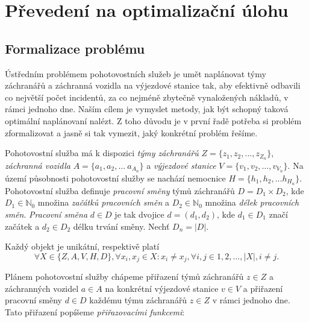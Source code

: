 \chapter{Převedení na optimalizační úlohu}

\section{Formalizace problému}

Ústředním problémem pohotovostních služeb je umět naplánovat týmy záchranářů a záchranná vozidla na výjezdové stanice tak, aby efektivně odbavili co největší počet incidentů,
za co nejméně zbytečně vynaložených nákladů, v rámci jednoho dne.
Naším cílem je vymyslet metody, jak být schopný taková optimální naplánovaní nalézt.
Z toho důvodu je v první řadě potřeba si problém zformalizovat a jasně si tak vymezit, jaký konkrétní problém řešíme.

Pohotovostní služba má k dispozici \textit{týmy záchranářů} $Z = \{ z_1, z_2, \dots, z_{Z_n} \}$, \textit{záchranná vozidla} $A = \{ a_1, a_2, \dots\ a_{A_n} \}$
a \textit{výjezdové stanice} $V = \{ v_1, v_2, \dots, v_{V_n} \}$. 
Na území působnosti pohotovostní služby se nachází nemocnice $H = \{ h_1, h_2, \dots h_{H_n} \}$.
Pohotovostní služba definuje \textit{pracovní směny} týmů záchranářů $D = D_{1} \times D_{2}$, 
kde $D_{1} \in \mathbb{N}_0$ množina \textit{začátků pracovních směn} a $D_{2} \in \mathbb{N}_0$ množina \textit{délek pracovních směn}.
\textit{Pracovní směna} $d \in D$ je tak dvojice $d = (d_1, d_2)$, kde $d_{1} \in D_{1}$ značí začátek a $d_{2} \in D_{2}$ délku trvání směny.
Nechť $D_n = |D|$.

Každý objekt je unikátní, respektivě platí
\begin{equation*}
  \forall X \in \{ Z, A, V, H, D\}, \forall x_i, x_j \in X \colon x_i \neq x_j, \forall i,j \in {1, 2, \dots, |X|}, i \neq j.
\end{equation*}

Plánem pohotovostní služby chápeme přiřazení týmů záchranářů $z \in Z$ a záchranných vozidel $a \in A$ na konkrétní výjezdové stanice $v \in V$
a přiřazení pracovní směny $d \in D$ každému týmu záchranářů $z \in Z$ v rámci jednoho dne.
Tato přiřazení popíšeme \textit{přiřazovacími funkcemi}:

